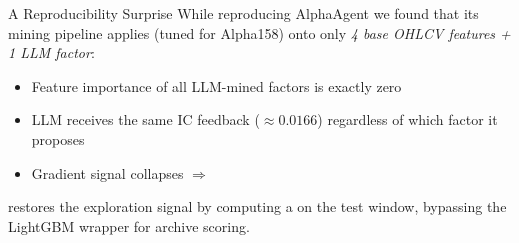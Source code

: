 \begin{frame}{A Reproducibility Surprise}
While reproducing AlphaAgent we found that its mining pipeline applies
(tuned for Alpha158) onto only \emph{4 base OHLCV features + 1 LLM factor}:
\medskip
\begin{itemize}
    \item Feature importance of all LLM-mined factors is \alert{exactly zero}
    \item LLM receives the \alert{same} IC feedback ($\approx 0.0166$) regardless
          of which factor it proposes
    \item Gradient signal collapses $\Rightarrow$ 
\end{itemize}
\medskip

\prjname{} restores the exploration signal by computing a
 on the test window, bypassing the
LightGBM wrapper for archive scoring.
\end{frame}

